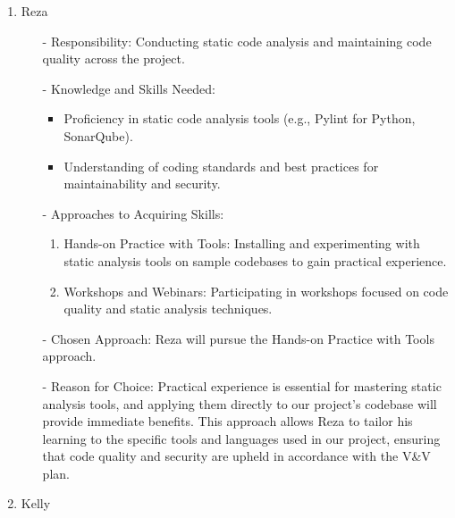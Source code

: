 \documentclass[12pt, titlepage]{article}
\begin{document}
\begin{enumerate}
\begin{enumerate}
\begin{enumerate}
\begin{enumerate}
\begin{enumerate}
  \item Reza

  \begin{itemize}
      \item[-] Responsibility: Conducting static code analysis and maintaining code quality across the project.
      \item[-] Knowledge and Skills Needed:
      \begin{itemize}
          \item Proficiency in static code analysis tools (e.g., Pylint for Python, SonarQube).
          \item Understanding of coding standards and best practices for maintainability and security.
      \end{itemize}
      \item[-] Approaches to Acquiring Skills:
      \begin{enumerate}
          \item Hands-on Practice with Tools: Installing and experimenting with static analysis tools on sample codebases to gain practical experience.
          \item Workshops and Webinars: Participating in workshops focused on code quality and static analysis techniques.
      \end{enumerate}
      \item[-] Chosen Approach: Reza will pursue the Hands-on Practice with Tools approach.
      \item[-] Reason for Choice: Practical experience is essential for mastering static analysis tools, and applying them directly to our project's codebase will provide immediate benefits. This approach allows Reza to tailor his learning to the specific tools and languages used in our project, ensuring that code quality and security are upheld in accordance with the V\&V plan.
  \end{itemize}

  \item Kelly


\end{enumerate}
\end{enumerate}
\end{enumerate}
\end{enumerate}
\end{enumerate}
\end{document}
